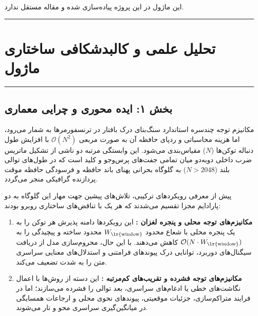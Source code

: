 \clearpage
{}
\vspace*{0.2cm}

این ماژول در این پروژه پیاده‌سازی شده و مقاله مستقل ندارد.
\noindent\rule{\textwidth}{1.2pt}
\vspace*{0.1cm}
\section{تحلیل علمی و کالبدشکافی ساختاری ماژول }
\label{sec:mod_optimized_hybrid_attention}
\vspace*{-0.2cm}
\noindent\rule{\textwidth}{0.5pt}
\vspace*{0.3cm}

\subsection*{بخش ۱: ایده محوری و چرایی معماری }
مکانیزم توجه چندسره استاندارد  سنگ‌بنای درک بافتار در ترنسفورمرها به شمار می‌رود، اما هزینه محاسباتی و ردپای حافظه آن به صورت مربعی $\mathcal{O}(N^2)$ با افزایش طول دنباله توکن‌ها ($N$) مقیاس‌بندی می‌شود. این وابستگی مرتبه دو ناشی از تشکیل ماتریس ضرب داخلی دوبه‌دو میان تمامی جفت‌های پرس‌وجو و کلید است که در طول‌های توالی بلند ($N > 2048$) به گلوگاه بحرانی پهنای باند حافظه  و فرسودگی حافظه موقت پردازنده گرافیکی منجر می‌گردد.

پیش از معرفی رویکردهای ترکیبی، تلاش‌های پیشین جهت مهار این گلوگاه به دو پارادایم مجزا تقسیم می‌شدند که هر یک با تناقض‌های ساختاری روبرو بودند:
\begin{enumerate}
    \item \textbf{مکانیزم‌های توجه محلی و پنجره لغزان :} این رویکردها دامنه پذیرش هر توکن را به یک پنجره محلی با شعاع محدود $W_{\text{\lr{window}}}$ محدود ساخته و پیچیدگی را به $\mathcal{O}(N \cdot W_{\text{\lr{window}}})$ کاهش می‌دهند. با این حال، محروم‌سازی مدل از دریافت سیگنال‌های دوربرد، توانایی درک پیوندهای فرامتنی و استدلال‌های معنایی سراسری متن را به شدت تضعیف می‌کند.
    \item \textbf{مکانیزم‌های توجه فشرده و تقریب‌های کم‌مرتبه :} این دسته از روش‌ها با اعمال نگاشت‌های خطی یا ادغام‌های سراسری، بعد توالی را فشرده می‌سازند؛ اما در فرایند متراکم‌سازی، جزئیات موقعیتی، پیوندهای نحوی محلی  و ارجاعات همسایگی در میانگین‌گیری سراسری محو و تار می‌شوند.
\end{enumerate}

